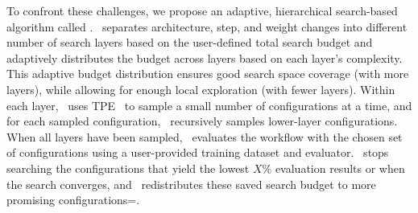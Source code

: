 To confront these challenges, we propose an adaptive, hierarchical search-based algorithm called \textbf{\textit{\search}}. 
\search\ separates architecture, step, and weight changes into different number of search layers based on the user-defined total search budget and adaptively distributes the budget across layers based on each layer's complexity. %
This adaptive budget distribution ensures good search space coverage (with more layers), while allowing for enough local exploration (with fewer layers). %
Within each layer, \search\ uses TPE~\cite{bergstra2011tpe} to sample a small number of configurations at a time, and for each sampled configuration, \search\ recursively samples lower-layer configurations. When all layers have been sampled, \search\ evaluates the workflow with the chosen set of configurations using a user-provided training dataset and evaluator. \search\ stops searching the configurations that yield the lowest $X$\% evaluation results or when the search converges, %
and \search\ redistributes these saved search budget to more promising configurations=.




